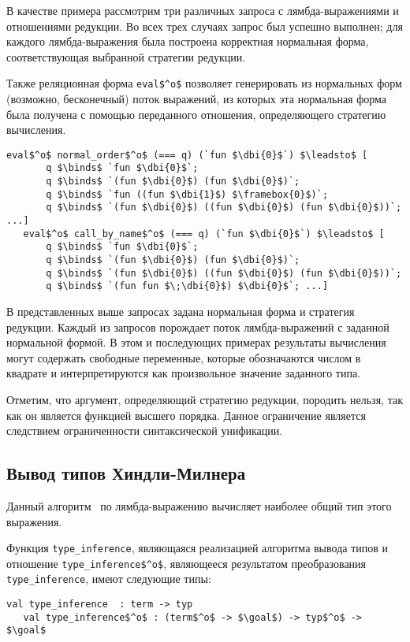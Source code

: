В качестве примера рассмотрим три различных запроса с лямбда-выражениями и отношениями редукции. Во всех трех случаях запрос был успешно выполнен; для каждого лямбда-выражения была построена корректная нормальная форма, соответствующая выбранной стратегии редукции.

Также реляционная форма  \lstinline|eval$^o$| позволяет генерировать из нормальных форм (возможно, бесконечный) поток выражений, из которых эта нормальная форма была получена с помощью переданного отношения, определяющего стратегию вычисления.

\begin{lstlisting}[basicstyle=\small]
   eval$^o$ normal_order$^o$ (=== q) (`fun $\dbi{0}$`) $\leadsto$ [
       q $\binds$ `fun $\dbi{0}$`; 
       q $\binds$ `(fun $\dbi{0}$) (fun $\dbi{0}$)`; 
       q $\binds$ `fun ((fun $\dbi{1}$) $\framebox{0}$)`; 
       q $\binds$ `(fun $\dbi{0}$) ((fun $\dbi{0}$) (fun $\dbi{0}$))`; ...] 
   eval$^o$ call_by_name$^o$ (=== q) (`fun $\dbi{0}$`) $\leadsto$ [
       q $\binds$ `fun $\dbi{0}$`; 
       q $\binds$ `(fun $\dbi{0}$) (fun $\dbi{0}$)`; 
       q $\binds$ `(fun $\dbi{0}$) ((fun $\dbi{0}$) (fun $\dbi{0}$))`; 
       q $\binds$ `(fun fun $\;\dbi{0}$) $\dbi{0}$`; ...] 
\end{lstlisting}

В представленных выше запросах задана нормальная форма и стратегия
редукции. Каждый из запросов порождает поток лямбда-выражений с
заданной нормальной формой. В этом и последующих примерах результаты
вычисления могут содержать свободные переменные, которые обозначаются
числом в квадрате и интерпретируются как произвольное значение заданного
типа.

Отметим, что аргумент, определяющий стратегию редукции, породить нельзя,
так как он является функцией высшего порядка. Данное ограничение является
следствием ограниченности синтаксической унификации.

\subsection{Вывод типов Хиндли-Милнера}

Данный алгоритм~\cite{lozov-spbu:Barendregt} по лямбда-выражению вычисляет наиболее общий тип этого выражения.
 
Функция \lstinline|type_inference|, являющаяся реализацией алгоритма вывода типов и отношение \lstinline|type_inference$^o$|, являющееся результатом преобразования \lstinline|type_inference|, имеют следующие типы:
\begin{lstlisting}[basicstyle=\small]
   val type_inference  : term -> typ
   val type_inference$^o$ : (term$^o$ -> $\goal$) -> typ$^o$ -> $\goal$
\end{lstlisting}

